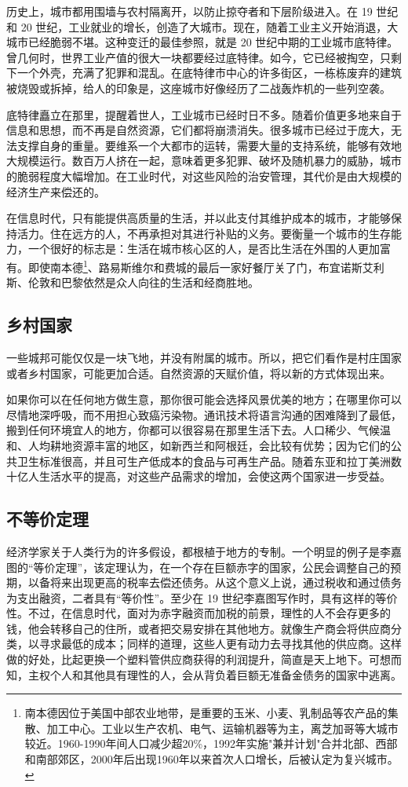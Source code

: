 历史上，城市都用围墙与农村隔离开，以防止掠夺者和下层阶级进入。在 19 世纪和 20 世纪，工业就业的增长，创造了大城市。现在，随着工业主义开始消退，大城市已经脆弱不堪。这种变迁的最佳参照，就是 20 世纪中期的工业城市底特律。曾几何时，世界工业产值的很大一块都要经过底特律。如今，它已经被掏空，只剩下一个外壳，充满了犯罪和混乱。在底特律市中心的许多街区，一栋栋废弃的建筑被烧毁或拆掉，给人的印象是，这座城市好像经历了二战轰炸机的一些列空袭。

底特律矗立在那里，提醒着世人，工业城市已经时日不多。随着价值更多地来自于信息和思想，而不再是自然资源，它们都将崩溃消失。很多城市已经过于庞大，无法支撑自身的重量。要维系一个大都市的运转，需要大量的支持系统，能够有效地大规模运行。数百万人挤在一起，意味着更多犯罪、破坏及随机暴力的威胁，城市的脆弱程度大幅增加。在工业时代，对这些风险的治安管理，其代价是由大规模的经济生产来偿还的。

在信息时代，只有能提供高质量的生活，并以此支付其维护成本的城市，才能够保持活力。住在远方的人，不再承担对其进行补贴的义务。要衡量一个城市的生存能力，一个很好的标志是：生活在城市核心区的人，是否比生活在外围的人更加富有。即使南本德\footnote{南本德因位于美国中部农业地带，是重要的玉米、小麦、乳制品等农产品的集散、加工中心。工业以生产农机、电气、运输机器等为主，离芝加哥等大城市较近。1960-1990年间人口减少超20\%，1992年实施"兼并计划"合并北部、西部和南部郊区，2000年后出现1960年以来首次人口增长，后被认定为复兴城市。}、路易斯维尔和费城的最后一家好餐厅关了门，布宜诺斯艾利斯、伦敦和巴黎依然是众人向往的生活和经商胜地。

\subsection{乡村国家}
一些城邦可能仅仅是一块飞地，并没有附属的城市。所以，把它们看作是村庄国家或者乡村国家，可能更加合适。自然资源的天赋价值，将以新的方式体现出来。

如果你可以在任何地方做生意，那你很可能会选择风景优美的地方；在哪里你可以尽情地深呼吸，而不用担心致癌污染物。通讯技术将语言沟通的困难降到了最低，搬到任何环境宜人的地方，你都可以很容易在那里生活下去。人口稀少、气候温和、人均耕地资源丰富的地区，如新西兰和阿根廷，会比较有优势；因为它们的公共卫生标准很高，并且可生产低成本的食品与可再生产品。随着东亚和拉丁美洲数十亿人生活水平的提高，对这些产品需求的增加，会使这两个国家进一步受益。

\subsection{不等价定理}
经济学家关于人类行为的许多假设，都根植于地方的专制。一个明显的例子是李嘉图的“等价定理”，该定理认为，在一个存在巨额赤字的国家，公民会调整自己的预期，以备将来出现更高的税率去偿还债务。从这个意义上说，通过税收和通过债务为支出融资，二者具有“等价性”。至少在 19 世纪李嘉图写作时，具有这样的等价性。不过，在信息时代，面对为赤字融资而加税的前景，理性的人不会存更多的钱，他会转移自己的住所，或者把交易安排在其他地方。就像生产商会将供应商分类，以寻求最低的成本；同样的道理，这些人更有动力去寻找其他的供应商。这样做的好处，比起更换一个塑料管供应商获得的利润提升，简直是天上地下。可想而知，主权个人和其他具有理性的人，会从背负着巨额无准备金债务的国家中逃离。

